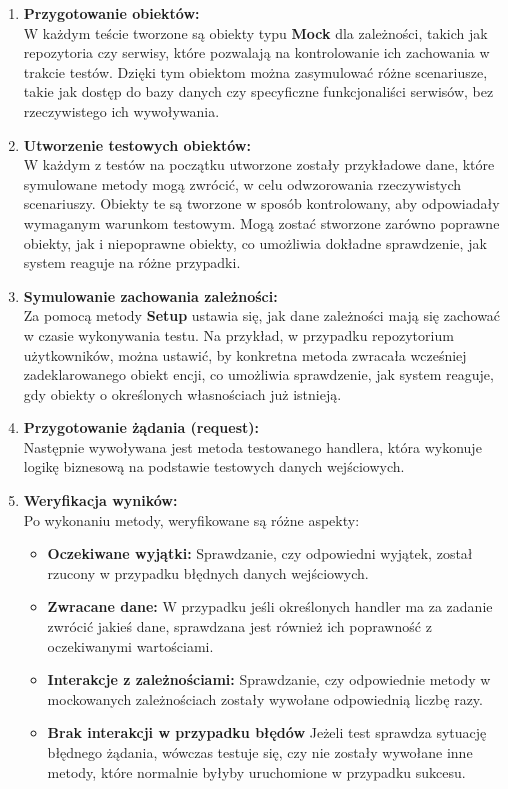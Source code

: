 \documentclass[12pt,a4paper]{article}
\begin{document}
\begin{enumerate}
    \item \textbf{Przygotowanie obiektów:}\\
    W każdym teście tworzone są obiekty typu \textbf{Mock} dla zależności, takich jak repozytoria czy serwisy, które pozwalają na kontrolowanie ich zachowania w trakcie testów. Dzięki tym obiektom można zasymulować różne scenariusze, takie jak dostęp do bazy danych czy specyficzne funkcjonaliści serwisów, bez rzeczywistego ich wywoływania.

    \item \textbf{Utworzenie testowych obiektów:}\\
    W każdym z testów na początku utworzone zostały przykładowe dane, które symulowane metody mogą zwrócić, w celu odwzorowania rzeczywistych scenariuszy. Obiekty te są tworzone w sposób kontrolowany, aby odpowiadały wymaganym warunkom testowym. Mogą zostać stworzone zarówno poprawne obiekty, jak i niepoprawne obiekty, co umożliwia dokładne sprawdzenie, jak system reaguje na różne przypadki.

    \item \textbf{Symulowanie zachowania zależności:}\\
    Za pomocą metody \textbf{Setup} ustawia się, jak dane zależności mają się zachować w czasie wykonywania testu. Na przykład, w przypadku repozytorium użytkowników, można ustawić, by konkretna metoda zwracała wcześniej zadeklarowanego obiekt encji, co umożliwia sprawdzenie, jak system reaguje, gdy obiekty o określonych własnościach już istnieją.

    \item \textbf{Przygotowanie żądania (request):}\\
    Następnie wywoływana jest metoda testowanego handlera, która wykonuje logikę biznesową na podstawie testowych danych wejściowych.

    \item \textbf{Weryfikacja wyników:} \\
    Po wykonaniu metody, weryfikowane są różne aspekty:

    \begin{itemize}
        \item \textbf{Oczekiwane wyjątki:} Sprawdzanie, czy odpowiedni wyjątek, został rzucony w przypadku błędnych danych wejściowych.
        \item \textbf{Zwracane dane:} W przypadku jeśli określonych handler ma za zadanie zwrócić jakieś dane, sprawdzana jest również ich poprawność z oczekiwanymi wartościami.
        \item \textbf{Interakcje z zależnościami:} Sprawdzanie, czy odpowiednie metody w mockowanych zależnościach zostały wywołane odpowiednią liczbę razy.
        \item \textbf{Brak interakcji w przypadku błędów} Jeżeli test sprawdza sytuację błędnego żądania, wówczas testuje się, czy nie zostały wywołane inne metody, które normalnie byłyby uruchomione w przypadku sukcesu.
    \end{itemize}

\end{enumerate}
\end{document}

